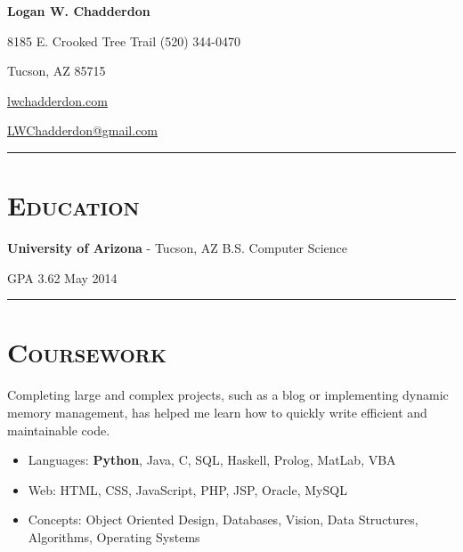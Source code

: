 \documentclass[11pt,letterpaper]{article}
\newcommand{\Hsep}{\vspace{4mm} \hrule \vspace{-1mm}}
\begin{document}
\begin{minipage}{\textwidth}

\begin{center}
\LARGE \bfseries Logan W. Chadderdon
\end{center}

8185 E. Crooked Tree Trail \hfill (520) 344-0470

\vspace{-3mm}
\begin{multicols}{3}
Tucson, AZ 85715 

\begin{center}
\href{http://lwchadderdon.com}{lwchadderdon.com}
\end{center}

\hfill \href{mailto:LWChadderdon@gmail.com}{LWChadderdon@gmail.com}

\end{multicols}


\vspace{-1mm}
\hrule


\section{\scshape Education}
\vspace{-2mm}
{\bfseries University of Arizona} - Tucson, AZ \hfill B.S. Computer Science

GPA 3.62 \hfill May 2014

\Hsep

\section{\scshape Coursework}
\vspace{-3mm}
Completing large and complex projects, such as a blog or implementing dynamic memory management,
has helped me learn how to quickly write efficient and maintainable code.
\vspace{2mm}
\begin{itemize}
 \item Languages: {\bfseries Python}, Java, C, SQL, Haskell, Prolog, MatLab, VBA
 \item Web: HTML, CSS, JavaScript, PHP, JSP, Oracle, MySQL
 \item Concepts: Object Oriented Design, Databases, Vision, Data Structures,
 Algorithms, Operating Systems  %
\end{itemize}
\vspace{-3mm}

\end{minipage}
\end{document}
